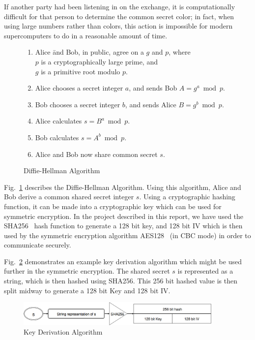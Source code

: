 \documentclass[12pt,a4paper]{article}
\begin{document}
If another party had been listening in on the exchange, it is computationally difficult for that person to determine the common secret color; in fact, when using large numbers rather than colors, this action is impossible for modern supercomputers to do in a reasonable amount of time.

\begin{figure}[h]
	\vspace{0.5cm}
	\begin{enumerate}
	\itemsep0em 
	\item 	\begin{tabbing} Alice \= and Bob, in public, agree on a $g$ and $p$, where \\
	\>$p$ is a cryptographically large prime, and\\
	\>$g$ is a primitive root modulo $p$.
		\end{tabbing}
	\item Alice chooses a secret integer $a$, and sends Bob $A = g^a \bmod p$.
	\item Bob chooses a secret integer $b$, and sends Alice $B = g^b \bmod p$.
	\item Alice calculates $s = B^a \bmod p$.
	\item Bob calculates $s = A^b \bmod p$.
	\item Alice and Bob now share common secret $s$.
	\end{enumerate}
	\caption{Diffie-Hellman Algorithm}
	\label{fig:dh-algo}
\end{figure}

Fig.~\ref{fig:dh-algo} describes the Diffie-Hellman Algorithm. Using this algorithm, Alice and Bob derive a common shared secret integer $s$. Using a cryptographic hashing function, it can be made into a cryptographic key which can be used for symmetric encryption. In the project described in this report, we have used the SHA256~\cite{sha} hash function to generate a 128 bit key, and 128 bit IV which is then used by the symmetric encryption algorithm AES128~\cite{aes} (in CBC mode) in order to communicate securely.

Fig.~\ref{fig:key-derivation} demonstrates an example key derivation algorithm which might be used further in the symmetric encryption. The shared secret $s$ is represented as a string, which is then hashed using SHA256. This 256 bit hashed value is then split midway to generate a 128 bit Key and 128 bit IV.

\begin{figure}[h]
	\centering
	\vspace{0.5cm}
	\includegraphics[width=0.9\textwidth]{pictures/key-derivation}
	\vspace{0.5cm}
	\caption{Key Derivation Algorithm}
	\label{fig:key-derivation}
\end{figure}
\end{document}
